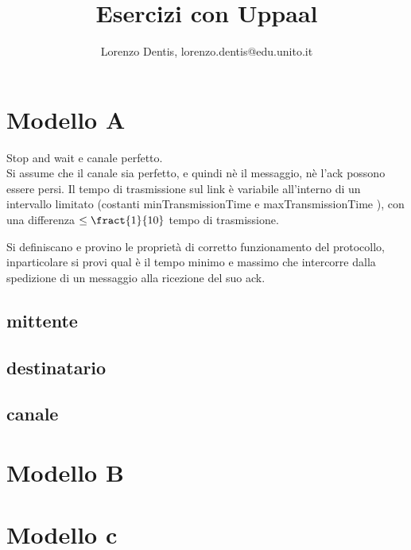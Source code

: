 \documentclass[a4paper]{article}
\begin{document}
\author{Lorenzo Dentis, lorenzo.dentis@edu.unito.it}
\title{Esercizi con Uppaal}
\maketitle
\section{Modello A}
Stop and wait e canale perfetto.\\ 
Si assume che il canale sia perfetto, e quindi nè il messaggio, nè l’ack possono essere persi. 
Il tempo di trasmissione sul link è variabile all’interno di un intervallo limitato (costanti minTransmissionTime e maxTransmissionTime ), con una differenza $\leq \fract{1}{10}$ tempo di trasmissione. 

Si definiscano e provino le proprietà di corretto funzionamento del protocollo, inparticolare si provi qual è il tempo minimo e massimo che intercorre dalla spedizione di un messaggio alla ricezione del suo ack.
\subsection{mittente}

\subsection{destinatario}
\subsection{canale}
\section{Modello B}
\section{Modello c}
\end{document}
